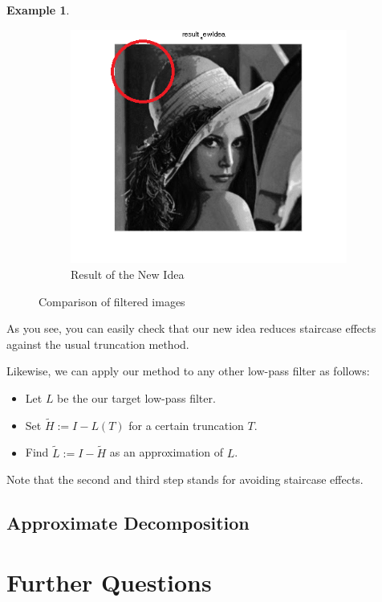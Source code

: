 \documentclass[12pt]{amsart}
\theoremstyle{definition}
\newtheorem{ex}[thm]{Example}
\theoremstyle{remark}
\numberwithin{thm}{section}
\begin{document}
\begin{ex}
\begin{figure}[h]
\begin{subfigure}[b]{0.3\textwidth} \includegraphics[width=\textwidth]{new.png} \caption{Result of the New Idea} \label{fig:new} \end{subfigure}
\caption{Comparison of filtered images}\label{fig:comp} 
\end{figure}

As you see, you can easily check that our new idea reduces staircase effects against the usual truncation method.
\end{ex}

Likewise, we can apply our method to any other low-pass filter as follows:

\begin{itemize}
\item[1.] Let $L$ be the our target low-pass filter.
\item[2.] Set $\tilde{H}:=I-L(T)$ for a certain truncation $T$.
\item[3.] Find $\tilde{L}:=I-\tilde{H}$ as an approximation of $L$.
\end{itemize}

Note that the second and third step stands for avoiding staircase effects.


\subsection{Approximate Decomposition}

\section{Further Questions}
\end{document}
